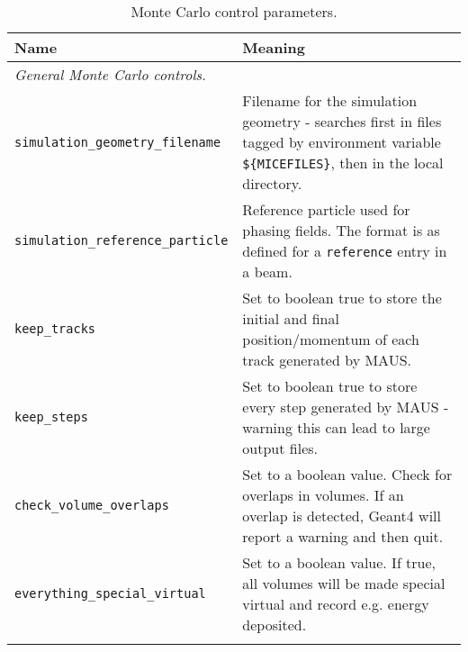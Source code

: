 \begin{table*}
\begin{center}
\caption{Monte Carlo control parameters.}
\begin{tabularx}{\textwidth}{lX}
Name & Meaning \\
\hline
\multicolumn{2}{l}{\emph{General Monte Carlo controls.}} \\
\hline
\verb|simulation_geometry_filename| & Filename for the simulation geometry - searches first in files tagged by environment variable \verb|${MICEFILES}|, then in the local directory.\\
\verb|simulation_reference_particle| & Reference particle used for phasing fields. The format is as defined for a \verb|reference| entry in a beam.\\
\verb|keep_tracks| & Set to boolean true to store the initial and final position/momentum of each track generated by MAUS.\\
\verb|keep_steps| & Set to boolean true to store every step generated by MAUS - warning this can lead to large output files.\\
\verb|check_volume_overlaps| & Set to a boolean value. Check for overlaps in volumes. If an overlap is detected, Geant4 will report a warning and then quit.\\
\verb|everything_special_virtual| & Set to a boolean value. If true, all volumes will be made special virtual and record e.g. energy deposited.\\
\begin{makeimage} %
\end{makeimage} 
\end{tabularx}
\end{center}
\end{table*}

